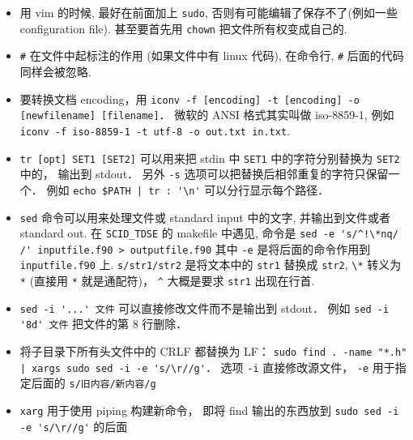 \begin{itemize}
\item 用 vim 的时候, 最好在前面加上 \verb`sudo`, 否则有可能编辑了保存不了(例如一些 configuration file). 甚至要首先用 \verb`chown` 把文件所有权变成自己的.
\item \verb`#` 在文件中起标注的作用 (如果文件中有 linux 代码), 在命令行, \verb`#` 后面的代码同样会被忽略.
\item 要转换文档 encoding，用 \verb|iconv -f [encoding] -t [encoding] -o [newfilename] [filename]|． 微软的 ANSI 格式其实叫做 iso-8859-1, 例如 \verb`iconv -f iso-8859-1 -t utf-8 -o out.txt in.txt`.
\item \verb|tr [opt] SET1 [SET2]| 可以用来把 stdin 中 \verb|SET1| 中的字符分别替换为 \verb|SET2| 中的， 输出到 stdout． 另外 \verb|-s| 选项可以把替换后相邻重复的字符只保留一个． 例如 \verb`echo $PATH | tr : '\n'` 可以分行显示每个路径．
\item \verb`sed` 命令可以用来处理文件或 standard input 中的文字, 并输出到文件或者 standard out. 在 \verb`SCID_TDSE` 的 makefile 中遇见, 命令是
\verb|sed -e 's/^!\*nq/    /' inputfile.f90 > outputfile.f90|
其中 \verb`-e` 是将后面的命令作用到 \verb`inputfile.f90` 上. \verb`s/str1/str2` 是将文本中的 \verb`str1` 替换成 \verb`str2`, \verb`\*` 转义为 \verb`*` (直接用 \verb`*` 就是通配符)， \verb`^` 大概是要求 \verb`str1` 出现在行首.
\item \verb|sed -i '...' 文件| 可以直接修改文件而不是输出到 stdout． 例如 \verb|sed -i '8d' 文件| 把文件的第 8 行删除．
\item 将子目录下所有头文件中的 CRLF 都替换为 LF： \verb`sudo find . -name "*.h" | xargs sudo sed -i -e 's/\r//g'`． 选项 \verb`-i` 直接修改源文件， \verb`-e` 用于指定后面的 \verb`s/旧内容/新内容/g`
\item \verb`xarg` 用于使用 piping 构建新命令， 即将 find 输出的东西放到 \verb`sudo sed -i -e 's/\r//g'` 的后面
\end{itemize}

